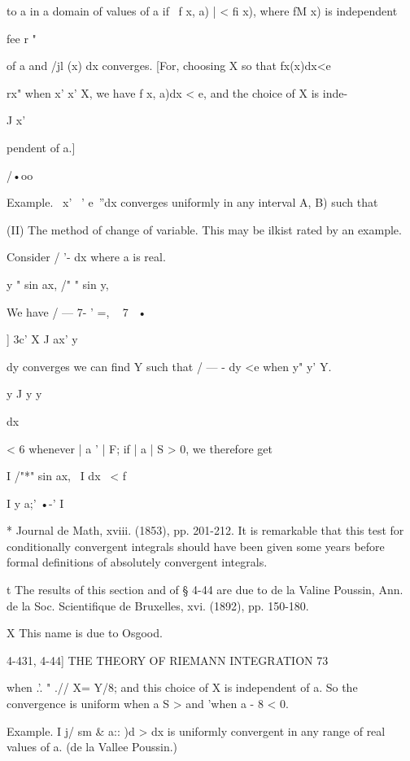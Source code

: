 to a in a domain of values of a if \ f x, a) | < fi x), where fM x) is
independent

fee r "

of a and /jl (x) dx converges. [For, choosing X so that fx(x)dx<e

rx" when x' x' X, we have f x, a)dx < e, and the choice of X is inde-

J x'

pendent of a.]

/•oo

Example. \ x' ~' e~''dx converges uniformly in any interval A, B) such
that

(II) The method of change of variable. This may be ilkist rated by an
example.

Consider / '- dx where a is real.

y " sin ax, /" " sin y,

We have / — 7- ' =, ~ 7~ •

] 3c' X J ax' y

   dy converges we can find Y such that / — - dy <e when y" y' Y.

y J y y






dx



< 6 whenever | a ' | F; if | a | S > 0, we therefore get

I /"*" sin ax, \ I dx \ < f

I y a;' •-' I



* Journal de Math, xviii. (1853), pp. 201-212. It is remarkable that
this test for conditionally convergent integrals should have been
given some years before formal definitions of absolutely convergent
integrals.

t The results of this section and of § 4-44 are due to de la Valine
Poussin, Ann. de la Soc. Scientifique de Bruxelles, xvi. (1892), pp.
150-180.

X This name is due to Osgood.



4-431, 4-44] THE THEORY OF RIEMANN INTEGRATION 73

when .'. " .// X= Y/8; and this choice of X is independent of a. So
the convergence is uniform when a S > and 'when a - 8 < 0.

Example. I j/ sm \& a:: )d > dx is uniformly convergent in any range
of real values of a. (de la Vallee Poussin.)

